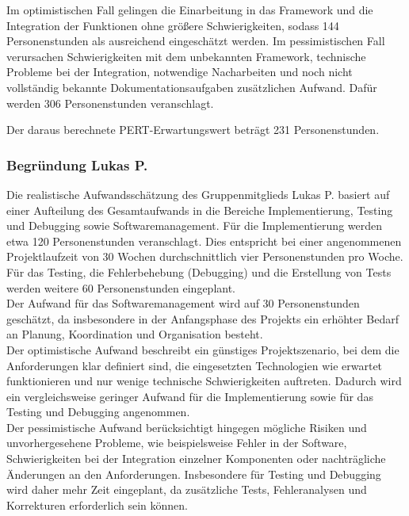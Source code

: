 \documentclass[a4paper,10pt]{article}
\begin{document}
    Im optimistischen Fall gelingen die Einarbeitung in das Framework und die Integration der Funktionen ohne grö\ss{}ere Schwierigkeiten, sodass 144 Personenstunden als ausreichend eingeschätzt werden. Im pessimistischen Fall verursachen Schwierigkeiten mit dem unbekannten Framework, technische Probleme bei der Integration, notwendige Nacharbeiten und noch nicht vollständig bekannte Dokumentationsaufgaben zusätzlichen Aufwand. Dafür werden 306 Personenstunden veranschlagt.

    Der daraus berechnete PERT-Erwartungswert beträgt 231 Personenstunden.

        \subsubsection*{Begründung Lukas P.}
        Die realistische Aufwandsschätzung des Gruppenmitglieds Lukas P. basiert auf einer Aufteilung des Gesamtaufwands in die Bereiche Implementierung, Testing und Debugging sowie Softwaremanagement.
        Für die Implementierung werden etwa 120 Personenstunden veranschlagt.
        Dies entspricht bei einer angenommenen Projektlaufzeit von 30 Wochen durchschnittlich vier Personenstunden pro Woche.\\
        Für das Testing, die Fehlerbehebung (Debugging) und die Erstellung von Tests werden weitere 60 Personenstunden eingeplant.\\
        Der Aufwand für das Softwaremanagement wird auf 30 Personenstunden geschätzt, da insbesondere in der Anfangsphase des Projekts ein erhöhter Bedarf an Planung, Koordination und Organisation besteht.\\
        Der optimistische Aufwand beschreibt ein günstiges Projektszenario, bei dem die Anforderungen klar definiert sind, die eingesetzten Technologien wie erwartet funktionieren und nur wenige technische Schwierigkeiten auftreten.
        Dadurch wird ein vergleichsweise geringer Aufwand für die Implementierung sowie für das Testing und Debugging angenommen. \\
        Der pessimistische Aufwand berücksichtigt hingegen mögliche Risiken und unvorhergesehene Probleme, wie beispielsweise Fehler in der Software, Schwierigkeiten bei der Integration einzelner Komponenten oder nachträgliche Änderungen an den Anforderungen.
        Insbesondere für Testing und Debugging wird daher mehr Zeit eingeplant, da zusätzliche Tests, Fehleranalysen und Korrekturen erforderlich sein können.\\\newline
\end{document}
